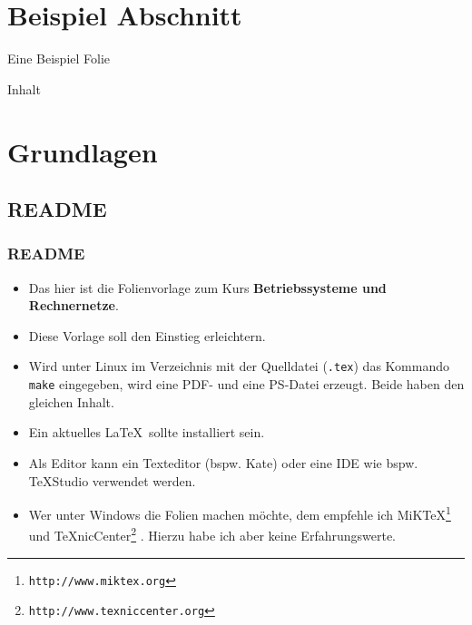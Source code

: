 
\section{Beispiel Abschnitt}
\label{sec:some}

\begin{frame}{Eine Beispiel Folie}
	
Inhalt
	
\end{frame}


\section{Grundlagen}

\subsection{README}

\begin{frame}[fragile]
	\frametitle{README}
	\begin{itemize}
		\item Das hier ist die Folienvorlage zum Kurs \textbf{Betriebssysteme und Rechnernetze}.
		\item Diese Vorlage soll den Einstieg erleichtern.
		\item Wird unter Linux im Verzeichnis mit der Quelldatei (\texttt{.tex}) das Kommando \texttt{make} eingegeben, wird eine PDF- und eine PS-Datei erzeugt. Beide haben den gleichen Inhalt.
		\item Ein aktuelles \LaTeX\ sollte installiert sein.
		\item Als Editor kann ein Texteditor (bspw. Kate) oder eine IDE wie bspw. TeXStudio \cite{TeXStudio} verwendet werden.
		\item Wer unter Windows die Folien machen möchte, dem empfehle ich MiK\TeX\footnote{\texttt{http://www.miktex.org}} \cite{MikTeX} und \TeX nicCenter\footnote{\texttt{http://www.texniccenter.org}} \cite{TexNic}. Hierzu habe ich aber keine Erfahrungswerte.
	\end{itemize}
\end{frame}

